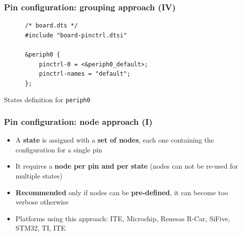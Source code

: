 \documentclass[handout]{beamer}
\begin{document}
\begin{frame}[fragile]
  \frametitle{Pin configuration: grouping approach (IV)}

  \begin{listing}[H]
    \begin{verbatim}
      /* board.dts */
      #include "board-pinctrl.dtsi"
  
      &periph0 {
          pinctrl-0 = <&periph0_default>;
          pinctrl-names = "default";
      };
    \end{verbatim}
    \caption{States definition for \texttt{periph0}}
  \end{listing}
\end{frame}

\begin{frame}
  \frametitle{Pin configuration: node approach (I)}

  \begin{itemize}
    \item <1-> A \textbf{state} is assigned with  a \textbf{set of nodes}, each
          one containing the configuration for a single pin
    \item<2-> It requires a \textbf{node per pin and per state} (nodes can not
          be re-used for multiple states)
    \item<3-> \textbf{Recommended} only if nodes can be \textbf{pre-defined},
          it can become too verbose otherwise
    \item<4-> Platforms using this approach: ITE, Microchip, Renesas R-Car,
          SiFive, STM32, TI, ITE
  \end{itemize}
\end{frame}
\end{document}
